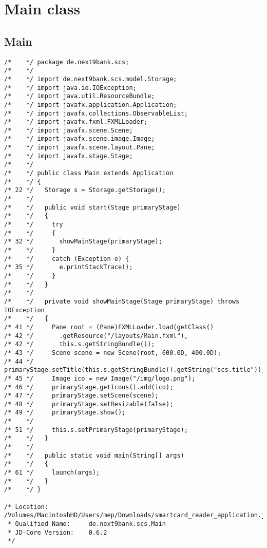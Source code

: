 \section{Main class}

\subsection{Main}

\begin{lstlisting}
/*    */ package de.next9bank.scs;
/*    */ 
/*    */ import de.next9bank.scs.model.Storage;
/*    */ import java.io.IOException;
/*    */ import java.util.ResourceBundle;
/*    */ import javafx.application.Application;
/*    */ import javafx.collections.ObservableList;
/*    */ import javafx.fxml.FXMLLoader;
/*    */ import javafx.scene.Scene;
/*    */ import javafx.scene.image.Image;
/*    */ import javafx.scene.layout.Pane;
/*    */ import javafx.stage.Stage;
/*    */ 
/*    */ public class Main extends Application
/*    */ {
/* 22 */   Storage s = Storage.getStorage();
/*    */ 
/*    */   public void start(Stage primaryStage)
/*    */   {
/*    */     try
/*    */     {
/* 32 */       showMainStage(primaryStage);
/*    */     }
/*    */     catch (Exception e) {
/* 35 */       e.printStackTrace();
/*    */     }
/*    */   }
/*    */ 
/*    */   private void showMainStage(Stage primaryStage) throws IOException
/*    */   {
/* 41 */     Pane root = (Pane)FXMLLoader.load(getClass()
/* 42 */       .getResource("/layouts/Main.fxml"), 
/* 42 */       this.s.getStringBundle());
/* 43 */     Scene scene = new Scene(root, 600.0D, 400.0D);
/* 44 */     primaryStage.setTitle(this.s.getStringBundle().getString("scs.title"));
/* 45 */     Image ico = new Image("/img/logo.png");
/* 46 */     primaryStage.getIcons().add(ico);
/* 47 */     primaryStage.setScene(scene);
/* 48 */     primaryStage.setResizable(false);
/* 49 */     primaryStage.show();
/*    */ 
/* 51 */     this.s.setPrimaryStage(primaryStage);
/*    */   }
/*    */ 
/*    */   public static void main(String[] args)
/*    */   {
/* 61 */     launch(args);
/*    */   }
/*    */ }

/* Location:           /Volumes/MacintoshHD/Users/mep/Downloads/smartcard_reader_application.jar
 * Qualified Name:     de.next9bank.scs.Main
 * JD-Core Version:    0.6.2
 */
\end{lstlisting}